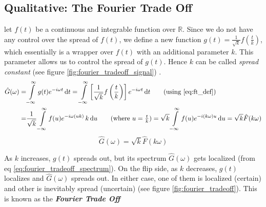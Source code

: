 \documentclass[11pt, a4paper]{article}
\newcommand{\quotedsingle}[1]{#1}	%
\newcommand{\quotedsingleit}[1]{\quotedsingle{\textit{#1}}}	%
\newcommand{\eqrefnp}[1]{\textup{\ref{#1}}}  %
\newcommand{\diff}{\mathop{}\!\mathrm{d}}
\newcommand{\du}{\diff u}
\newcommand{\dt}{\diff t}
\newcommand{\dint}[2]{\int \limits_{#1}^{#2}}  %
\newcommand{\intinfty}{\dint{-\infty}{\infty}}	%
\begin{document}
	\subsection{Qualitative: The Fourier Trade Off}\label{sec:fourier_uncertainity_principle_qualitative}
	let $f(t)$ be a continuous and integrable function over $\mathbb{R}$. Since we do not have any control over the spread of $f(t)$, we define a new function $g(t) = \frac{1}{\sqrt{k}} f \left( \frac{t}{k} \right)$, which essentially is a wrapper over $f(t)$ with an additional parameter $k$. This parameter allows us to control the spread of $g(t)$. Hence $k$ can be called \quotedsingleit{spread constant} (see figure \ref{fig:fourier_tradeoff_signal}) \cite{dubey2021fourieruncertainity}.
	\begin{align*}
		\hat{G}(\omega) = & \intinfty g(t) e^{-i \omega t} \dt
		= \intinfty \left[ \frac{1}{\sqrt{k}} f \left( \frac{t}{k} \right) \right] e^{-i \omega t} \dt  \tag{using \eqrefnp{eq:ft_def}} \\
		= & \frac{1}{\sqrt{k}} \intinfty f(u) e^{-i \omega (uk)} \, k \du  \tag{where $u = \frac{t}{k}$} 
		= \sqrt{k} \intinfty f(u) e^{-i (k \omega) u} \du = \sqrt{k} \hat{F}(k \omega) 
	\end{align*}
	\begin{equation}\label{eq:fourier_tradeoff_spectrum}
		\boxed{
			\hat{G}(\omega) = \sqrt{k} \hat{F}(k \omega)
		}
	\end{equation}
	
	As $k$ increases, $g(t)$ spreads out, but its spectrum $\hat{G}(\omega)$ gets localized (from eq \eqrefnp{eq:fourier_tradeoff_spectrum}). On the flip side, as $k$ decreases, $g(t)$ localizes and $\hat{G}(\omega)$ spreads out. In either case, one of them is localized (certain) and other is inevitably spread (uncertain) (see figure \ref{fig:fourier_tradeoff}). This is known as the \textbf{\textit{Fourier Trade Off}}
	
\end{document}
